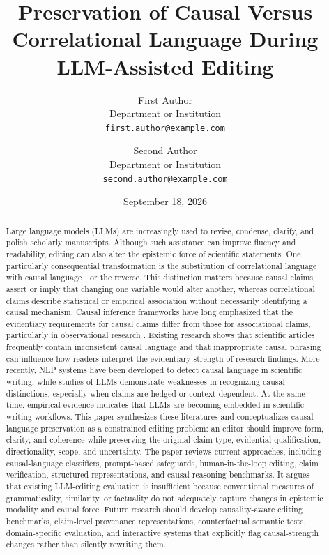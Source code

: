 \documentclass[11pt]{article}
\title{Preservation of Causal Versus Correlational Language During LLM-Assisted Editing}
\author{
  First Author\\
  Department or Institution\\
  \texttt{first.author@example.com}
  \and
  Second Author\\
  Department or Institution\\
  \texttt{second.author@example.com}
}
\date{September 18, 2026}
\begin{document}
\maketitle

\begin{abstract}
Large language models (LLMs) are increasingly used to revise, condense, clarify, and polish scholarly manuscripts. Although such assistance can improve fluency and readability, editing can also alter the epistemic force of scientific statements. One particularly consequential transformation is the substitution of correlational language with causal language---or the reverse. This distinction matters because causal claims assert or imply that changing one variable would alter another, whereas correlational claims describe statistical or empirical association without necessarily identifying a causal mechanism. Causal inference frameworks have long emphasized that the evidentiary requirements for causal claims differ from those for associational claims, particularly in observational research \cite{rubin1974,pearl2009}. Existing research shows that scientific articles frequently contain inconsistent causal language and that inappropriate causal phrasing can influence how readers interpret the evidentiary strength of research findings. More recently, NLP systems have been developed to detect causal language in scientific writing, while studies of LLMs demonstrate weaknesses in recognizing causal distinctions, especially when claims are hedged or context-dependent. At the same time, empirical evidence indicates that LLMs are becoming embedded in scientific writing workflows. This paper synthesizes these literatures and conceptualizes causal-language preservation as a constrained editing problem: an editor should improve form, clarity, and coherence while preserving the original claim type, evidential qualification, directionality, scope, and uncertainty. The paper reviews current approaches, including causal-language classifiers, prompt-based safeguards, human-in-the-loop editing, claim verification, structured representations, and causal reasoning benchmarks. It argues that existing LLM-editing evaluation is insufficient because conventional measures of grammaticality, similarity, or factuality do not adequately capture changes in epistemic modality and causal force. Future research should develop causality-aware editing benchmarks, claim-level provenance representations, counterfactual semantic tests, domain-specific evaluation, and interactive systems that explicitly flag causal-strength changes rather than silently rewriting them.
\end{abstract}
\end{document}
